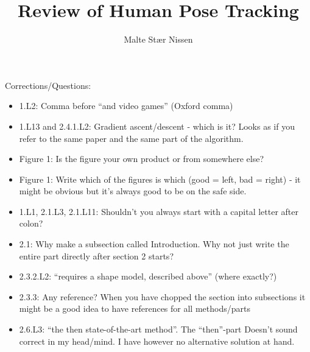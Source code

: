 \documentclass[11pt,a4paper]{article}
\title{Review of Human Pose Tracking}
\author{Malte Stær Nissen}
\begin{document}
\maketitle

\noindent Corrections/Questions:
\begin{itemize}
    \item 1.L2: Comma before ``and video games'' (Oxford comma)
    \item 1.L13 and 2.4.1.L2: Gradient ascent/descent - which is it? Looks as if you refer to
        the same paper and the same part of the algorithm.
    \item Figure 1: Is the figure your own product or from somewhere else?
    \item Figure 1: Write which of the figures is which (good = left, bad =
        right) - it might be obvious but it's always good to be on the safe
        side.
    \item 1.L1, 2.1.L3, 2.1.L11: Shouldn't you always start with a capital letter after colon?
    \item 2.1: Why make a subsection called Introduction. Why not just write the
        entire part directly after section 2 starts?
    \item 2.3.2.L2: ``requires a shape model, described above'' (where exactly?)
    \item 2.3.3: Any reference? When you have chopped the section into
        subsections it might be a good idea to have references for all
        methods/parts
    \item 2.6.L3: ``the then state-of-the-art method''. The ``then''-part Doesn't sound correct
        in my head/mind. I have however no alternative solution at hand.
\end{itemize}
\end{document}
